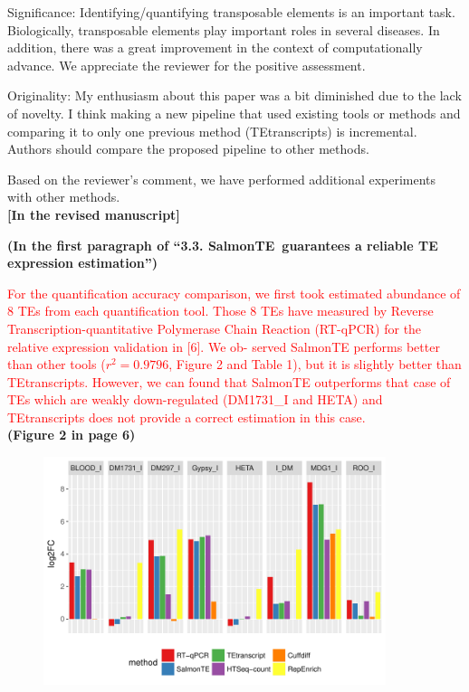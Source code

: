 \documentclass[10pt]{article}
\begin{document}
\begin{response}{Significance: Identifying/quantifying transposable elements is an important task. Biologically, transposable elements play important roles in several diseases. In addition, there was a great improvement in the context of computationally advance.}
We appreciate the reviewer for the positive assessment. 
\end{response}

\begin{response}{Originality: My enthusiasm about this paper was a bit diminished due to the lack of novelty. I think making a new pipeline that used existing tools or methods and comparing it to only one previous method (TEtranscripts) is incremental. Authors should compare the proposed pipeline to other methods.}

Based on the reviewer's comment, we have performed additional experiments with other methods.  
\\

\textbf{[In the revised manuscript]} 

\textbf{(In the first paragraph of ``3.3. SalmonTE~guarantees a reliable TE expression estimation'')}

\textcolor{red}{
For the quantification accuracy comparison, we first took estimated abundance of 8 TEs from each quantification tool. Those 8 TEs have measured by Reverse Transcription-quantitative Polymerase Chain Reaction (RT-qPCR) for the relative expression validation in [6]. We ob- served SalmonTE performs better than other tools ($r^2 = 0.9796$, Figure 2 and Table 1), but it is slightly better than TEtranscripts. However, we can found that SalmonTE outperforms that case of TEs which are weakly down-regulated (DM1731\_I and HETA) and TEtranscripts does not provide a correct estimation in this case.}
\\

\textbf{(Figure 2 in page 6)}
\begin{figure}[h]
\centerline{
\includegraphics[width=10cm]{fig_bar}
}
\end{figure}



\end{response}
\end{document}
